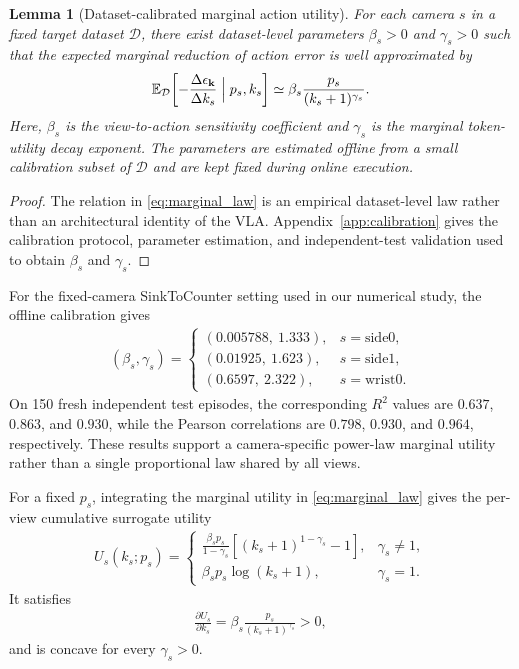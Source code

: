 \documentclass[lettersize,journal]{IEEEtran}
\theoremstyle{custom}
\newtheorem{Lem}{Lemma}
\begin{document}
\begin{Lem}[Dataset-calibrated marginal action utility]\label{lem:marginal_law}
For each camera $s$ in a fixed target dataset $\mathcal D$, there exist dataset-level parameters $\beta_s>0$ and $\gamma_s>0$ such that the expected marginal reduction of action error is well approximated by
\begin{align}\label{eq:marginal_law}
    \mathbb E_{\mathcal D}\!\left[
    -\frac{\Delta\epsilon_{\bf k}}{\Delta k_s}
    \Bigm| p_s,k_s\right]
    \simeq
    \beta_s\frac{p_s}{(k_s+1)^{\gamma_s}}.
\end{align}
Here, $\beta_s$ is the view-to-action sensitivity coefficient and $\gamma_s$ is the marginal token-utility decay exponent. The parameters are estimated offline from a small calibration subset of $\mathcal D$ and are kept fixed during online execution.
\end{Lem}
\begin{proof}
The relation in \eqref{eq:marginal_law} is an empirical dataset-level law rather than an architectural identity of the VLA. Appendix~\ref{app:calibration} gives the calibration protocol, parameter estimation, and independent-test validation used to obtain $\beta_s$ and $\gamma_s$.
\end{proof}

For the fixed-camera SinkToCounter setting used in our numerical study, the offline calibration gives
\begin{align}
(\beta_s,\gamma_s)=
\begin{cases}
(0.005788,\ 1.333), & s=\mathrm{side0},\\
(0.01925,\ 1.623), & s=\mathrm{side1},\\
(0.6597,\ 2.322), & s=\mathrm{wrist0}.
\end{cases}\label{eq:fitted_params}
\end{align}
On 150 fresh independent test episodes, the corresponding $R^2$ values are $0.637$, $0.863$, and $0.930$, while the Pearson correlations are $0.798$, $0.930$, and $0.964$, respectively. These results support a camera-specific power-law marginal utility rather than a single proportional law shared by all views.

For a fixed $p_s$, integrating the marginal utility in \eqref{eq:marginal_law} gives the per-view cumulative surrogate utility
\begin{align}\label{eq:utility}
U_s(k_s;p_s)=
\begin{cases}
\displaystyle
\frac{\beta_s p_s}{1-\gamma_s}
\left[(k_s+1)^{1-\gamma_s}-1\right], & \gamma_s\neq1,\\[2mm]
\displaystyle
\beta_s p_s\log(k_s+1), & \gamma_s=1.
\end{cases}
\end{align}
It satisfies
\begin{align}
    \frac{\partial U_s}{\partial k_s}
    =\beta_s\frac{p_s}{(k_s+1)^{\gamma_s}}>0,
\end{align}
and is concave for every $\gamma_s>0$.
\end{document}
